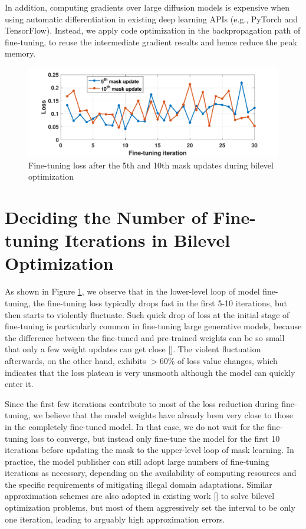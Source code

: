 \documentclass{article}
\begin{document}
In addition, computing gradients over large diffusion models is expensive when using automatic differentiation in existing deep learning APIs (e.g., PyTorch and TensorFlow). Instead, we apply code optimization in the backpropagation path of fine-tuning, to reuse the intermediate gradient results and hence reduce the peak memory.


\begin{figure}[h]
	\centering
	\vspace{-0.05in}
	\includegraphics[width=0.9\linewidth]{figures/loss_fluctuation.pdf}
	\caption{Fine-tuning loss after the 5th and 10th mask updates during bilevel optimization}
	\label{fig:loss_fluctuation}
\end{figure}

\section{Deciding the Number of Fine-tuning Iterations in Bilevel Optimization}
\label{sec:finetune_interval}
As shown in Figure \ref{fig:loss_fluctuation}, we observe that in the lower-level loop of model fine-tuning, the fine-tuning loss typically drops fast in the first 5-10 iterations, but then starts to violently fluctuate. Such quick drop of loss at the initial stage of fine-tuning is particularly common in fine-tuning large generative models, because the difference between the fine-tuned and pre-trained weights can be so small that only a few weight updates can get close []. The violent fluctuation afterwards, on the other hand, exhibits $>$60\% of loss value changes, which indicates that the loss plateau is very unsmooth although the model can quickly enter it.

Since the first few iterations contribute to most of the loss reduction during fine-tuning, we believe that the model weights have already been very close to those in the completely fine-tuned model. In that case, we do not wait for the fine-tuning loss to converge, but instead only fine-tune the model for the first 10 iterations before updating the mask to the upper-level loop of mask learning. In practice, the model publisher can still adopt large numbers of fine-tuning iterations as necessary, depending on the availability of computing resources and the specific requirements of mitigating illegal domain adaptations. Similar approximation schemes are also adopted in existing work [] to solve bilevel optimization problems, but most of them aggressively set the interval to be only one iteration, leading to arguably high approximation errors. 
\end{document}
